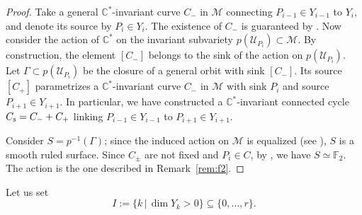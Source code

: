 \documentclass[10pt,a4paper]{article}
\numberwithin{equation}{section}
\theoremstyle{definition}
\theoremstyle{remark}
\newcommand\FF{{\mathbb{F}}}
\def\C{{\mathbb C}}
\def\cM{{\mathcal M}}
\def\cU{{\mathcal U}}
\begin{document}
\begin{proof}
Take a general $\C^*$-invariant curve $C_-$ in $\cM$ connecting $P_{i-1}\in Y_{i-1}$ to $Y_i$, and denote its source by $P_{i}\in Y_i$.  The existence of $C_-$ is guaranteed by \cite[Theorem~5.3]{OS2}. Now consider the action of $\C^*$ on the invariant subvariety $p(\cU_{P_i})\subset\cM$. By construction, the element $[C_-]$ belongs to the sink of the action on $p(\cU_{P_i})$. Let $\Gamma \subset p(\cU_{P_i})$ be the closure of a general orbit with sink $[C_-]$. Its source $[C_+]$ parametrizes a $\C^*$-invariant curve $C_-$ in $\cM$ with sink $P_i$ and source $P_{i+1} \in Y_{i+1}$.  In particular, we have constructed a $\C^*$-invariant connected cycle $C_{\mbox{\scriptsize{s}}} = C_-+C_+$ linking $P_{i-1}\in Y_{i-1}$ to $P_{i+1}\in Y_{i+1}$.

Consider $S= p^{-1}(\Gamma)$; since the induced action on $\cM$ is equalized (see \cite[Proposition 4.5]{OS2}), $S$ is a smooth ruled surface. Since $C_\pm$ are not fixed and $P_i \in C$, by \cite[Proposition 4.6]{OS2}, we have $S \simeq \FF_2$. The action is the one described in Remark~\ref{rem:f2}.
\end{proof}

Let us set
\begin{equation}\label{eq:I}
I :=\{k\,|\, \dim Y_k >0\}\subseteq \{0,\dots, r\}.
\end{equation}
\end{document}
